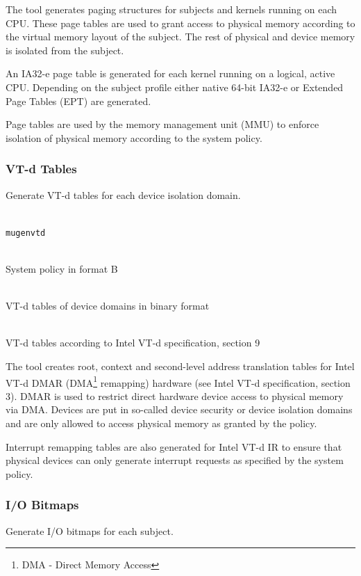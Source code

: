 \documentclass[a4paper,twoside,titlepage]{article}
\begin{document}
The tool generates paging structures for subjects and kernels running on each
CPU. These page tables are used to grant access to physical memory according to
the virtual memory layout of the subject. The rest of physical and device
memory is isolated from the subject.

An IA32-e page table is generated for each kernel running on a logical, active
CPU. Depending on the subject profile either native 64-bit IA32-e or Extended
Page Tables (EPT) are generated.

Page tables are used by the memory management unit (MMU) to enforce isolation
of physical memory according to the system policy.

\subsubsection{VT-d Tables}
Generate VT-d tables for each device isolation domain.

\begin{description} \itemsep1pt \parskip0pt
	\item[Name] \hfill \\
		\texttt{mugenvtd}
	\item[Input] \hfill \\
		System policy in format B
	\item[Output] \hfill \\
		VT-d tables of device domains in binary format
	\item[Output format] \hfill \\
		VT-d tables according to Intel VT-d specification, section 9
\end{description}

The tool creates root, context and second-level address translation tables for
Intel VT-d DMAR (DMA\footnote{DMA - Direct Memory Access} remapping) hardware
(see Intel VT-d specification, section 3). DMAR is used to restrict direct
hardware device access to physical memory via DMA. Devices are put in so-called
device security or device isolation domains and are only allowed to access
physical memory as granted by the policy.

Interrupt remapping tables are also generated for Intel VT-d IR to ensure that
physical devices can only generate interrupt requests as specified by the system
policy.

\subsubsection{I/O Bitmaps}
Generate I/O bitmaps for each subject.
\end{document}
